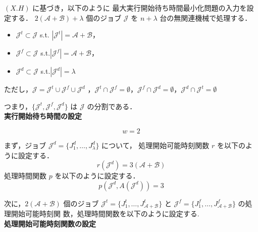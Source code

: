 \documentclass[12pt]{optlab-bachelor}
\begin{document}
$(X.H)$ に基づき，以下のように 最大実行開始待ち時間最小化問題の入力を設定する．
$2(\mathcal{A} + \mathcal{B}) + \lambda$ 個のジョブ $\mathcal{J}$ を
$n + \lambda$ 台の無関連機械で処理する．
\begin{itemize}
\item $\mathcal{J}^t \subset \mathcal{J}$ s.t. $|\mathcal{J}^t| =
  \mathcal{A}  + \mathcal{B}$，
\item $\mathcal{J}^f \subset \mathcal{J}$
  s.t.$|\mathcal{J}^f| = \mathcal{A}  + \mathcal{B}$，
\item $\mathcal{J}^d \subset \mathcal{J}$ s.t.$|\mathcal{J}^d| =
  \lambda$
\end{itemize}
ただし，$\mathcal{J} = \mathcal{J}^t \cup \mathcal{J}^f \cup
\mathcal{J}^d$ ，$\mathcal{J}^t \cap \mathcal{J}^f = \emptyset$，$\mathcal{J}^f \cap \mathcal{J}^d = \emptyset$，$\mathcal{J}^d \cap \mathcal{J}^t = \emptyset$

つまり，$\{\mathcal{J}^t, \mathcal{J}^f,\mathcal{J}^d\}$ は $\mathcal{J}$ の分割である．\\

\noindent \textbf{実行開始待ち時間の設定}

$$w = 2$$

まず，ジョブ $\mathcal{J}^d = \{J^d_1,\ldots,J^d_{\lambda}\}$ について，
処理開始可能時刻関数 $r$ を以下のように設定する．
$$r(\mathcal{J}^d) = 3(\mathcal{A} + \mathcal{B})$$
処理時間関数 $p$ を以下のように設定する．
$$p(\mathcal{J}^d, A(\mathcal{J}^d)) = 3$$

次に，$2(\mathcal{A} + \mathcal{B})$ 個のジョブ $\mathcal{J}^t =
\{J^t_1,\ldots,J^t_{\mathcal{A} + \mathcal{B}}\}$ と $\mathcal{J}^f =
\{J^f_1,\ldots,J^f_{\mathcal{A} + \mathcal{B}}\}$ の処理開始可能時刻関
数，処理時間関数を以下のように設定する.\\

\noindent \textbf{処理開始可能時刻関数の設定}
\end{document}
